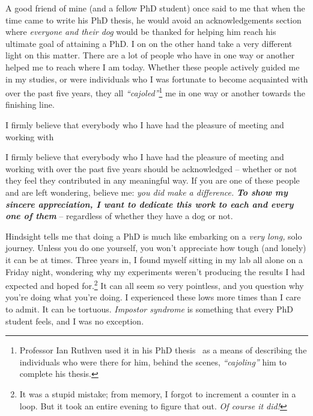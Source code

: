 

\begin{preamble}
{}

A good friend of mine (and a fellow PhD student) once said to me that when the time came to write his PhD thesis, he would avoid an acknowledgements section where \emph{everyone and their dog} would be thanked for helping him reach his ultimate goal of attaining a PhD. I on on the other hand take a very different light on this matter. There are a lot of people who have in one way or another helped me to reach where I am today. Whether these people actively guided me in my studies, or were individuals who I was fortunate to become acquainted with over the past five years, they all \emph{``cajoled''}\footnote{Professor Ian Ruthven used it in his PhD thesis~\citep{ruthven2001phd} as a means of describing the individuals who were there for him, behind the scenes, \emph{``cajoling''} him to complete his thesis.} me in one way or another towards the finishing line.

I firmly believe that everybody who I have had the pleasure of meeting and working with 


\todo{=====}


I firmly believe that everybody who I have had the pleasure of meeting and working with over the past five years should be acknowledged -- whether or not they feel they contributed in any meaningful way. If you are one of these people and are left wondering, believe me: \emph{you did make a difference.} \textbf{\emph{To show my sincere appreciation, I want to dedicate this work to each and every one of them}} -- regardless of whether they have a dog or not.

Hindsight tells me that doing a PhD is much like embarking on a \emph{very long,} solo journey. Unless you do one yourself, you won't appreciate how tough (and lonely) it can be at times. Three years in, I found myself sitting in my lab all alone on a Friday night, wondering why my experiments weren't producing the results I had expected and hoped for.\footnote{It was a stupid mistake; from memory, I forgot to increment a counter in a loop. But it took an entire evening to figure that out. \emph{Of course it did!}} It can all seem so very pointless, and you question why you're doing what you're doing. I experienced these lows more times than I care to admit. It can be tortuous. \emph{Impostor syndrome} is something that every PhD student feels, and I was no exception.


\end{preamble}
